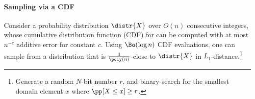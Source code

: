 \paragraph{Sampling via a CDF}\label{para:CDF}
Consider a probability distribution $\distr{X}$ over $O(n)$ consecutive integers, whose cumulative distribution function (CDF) for can be computed with at most $n^{-c}$ additive error for constant $c$.
Using $\Bo(\log n)$ CDF evaluations, one can sample from a distribution that is
$\frac{1}{\poly(n)}$-close to $\distr{X}$ in $L_1$-distance.\footnote{Generate a random $N$-bit number $r$, and binary-search for the smallest domain element $x$ where $\pp[X\leq x] \geq r$.}
